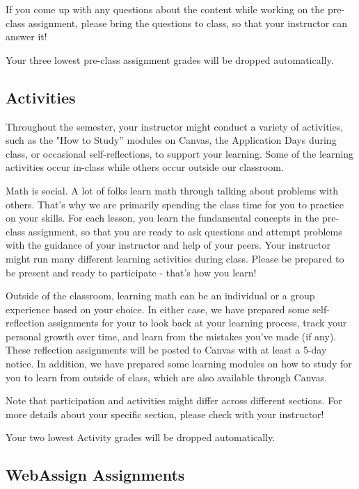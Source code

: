 \documentclass[12pt]{article}
\begin{document}
        If you come up with any questions about the content while working on the pre-class assignment, please bring the questions to class, so that your instructor can answer it!
        
        Your three lowest pre-class assignment grades will be dropped automatically.
        
        \subsection{Activities}
        
        Throughout the semester, your instructor might conduct a variety of activities, such as the "How to Study'' modules on Canvas, the Application Days during class, or occasional self-reflections, to support your learning. Some of the learning activities occur in-class while others occur outside our classroom. 

        Math is social. A lot of folks learn math through talking about problems with others. That's why we are primarily spending the class time for you to practice on your skills. For each lesson, you learn the fundamental concepts in the pre-class assignment, so that you are ready to ask questions and attempt problems with the guidance of your instructor and help of your peers. Your instructor might run many different learning activities during class. Please be prepared to be present and ready to participate - that's how you learn!

        Outside of the classroom, learning math can be an individual or a group experience based on your choice. In either case, we have prepared some self-reflection assignments for your to look back at your learning process, track your personal growth over time, and learn from the mistakes you've made (if any). These reflection assignments will be posted to Canvas with at least a 5-day notice. In addition, we have prepared some learning modules on how to study for you to learn from outside of class, which are also available through Canvas. 

        Note that participation and activities might differ across different sections. For more details about your specific section, please check with your instructor!

        Your two lowest Activity grades will be dropped automatically.
        
        \subsection{WebAssign Assignments}
        	
\end{document}
